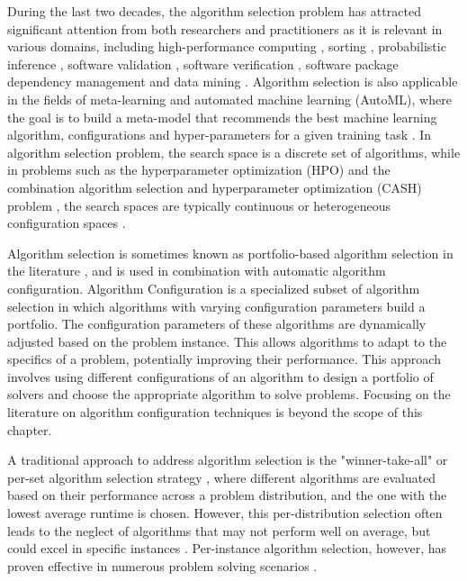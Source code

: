 During the last two decades, the algorithm selection problem has attracted significant attention from both researchers and practitioners as it is relevant in various domains, including high-performance computing \cite{FlorinaOpneMP}, sorting \cite{10.5120/ijca2016910726}, probabilistic inference \cite{sotingAS,KOCAMAZ201394}, software validation \cite{10.1007/s10515-020-00270-x}, software verification \cite{9463528,10.1145/3637225}, software package dependency management \cite{osti_2223030} and data mining \cite{10.4108/ICST.SIMUTOOLS2009.5659, 10.1145/3411564.3411646}. Algorithm selection is also applicable in the fields of meta-learning and automated machine learning (AutoML), where the goal is to build a meta-model that recommends the best machine learning algorithm, configurations and hyper-parameters for a given training task \cite{brazdil2022metalearning, Vanschoren2019, hutter2019automated}. In algorithm selection problem, the search space is a discrete set of algorithms, while in problems such as the hyperparameter optimization (HPO) and the combination algorithm selection and hyperparameter optimization (CASH) problem \cite{10.1145/2487575.2487629}, the search spaces are typically continuous or heterogeneous configuration spaces \cite{brazdil2022metalearning}.

Algorithm selection is sometimes known as portfolio-based algorithm selection in the literature \cite{10.5555/2898607.2898641,XuEtAl11}, and is used in combination with automatic algorithm configuration. Algorithm Configuration is a specialized subset of algorithm selection \cite{10.1007/978-3-319-09584-4_4} in which algorithms with varying configuration parameters build a portfolio. The configuration parameters of these algorithms are dynamically adjusted based on the problem instance. This allows algorithms to adapt to the specifics of a problem, potentially improving their performance. This approach involves using different configurations of an algorithm to design a portfolio of solvers and choose the appropriate algorithm to solve problems. Focusing on the literature on algorithm configuration techniques is beyond the scope of this chapter.

A traditional approach to address algorithm selection is the "winner-take-all" or per-set algorithm selection strategy \cite{10.1162/evco_a_00242}, where different algorithms are evaluated based on their performance across a problem distribution, and the one with the lowest average runtime is chosen. However, this per-distribution selection often leads to the neglect of algorithms that may not perform well on average, but could excel in specific instances \cite{10.5555/1630659.1630927}. Per-instance algorithm selection, however, has proven effective in numerous problem solving scenarios \cite{BISCHL201641}. 

